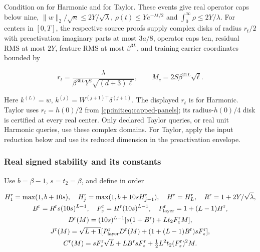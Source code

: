 Condition on  for Harmonic and
 for Taylor. These events give real operator caps below nine,
$\|w\|_2/\sqrt n\le2Y/\sqrt\lambda$,
$\rho(t)\le Ye^{-\lambda t/2}$ and $\int_0^\infty\rho\le2Y/\lambda$.
For centers in $[0,T]$, the respective source proofs supply complex
disks of radius $r_t/2$ with preactivation imaginary parts at most
$3a/8$, operator caps ten, residual RMS at most $2Y$, feature RMS at most
$\beta^{3L}$, and training carrier coordinates bounded by

\begin{equation}
\label{cp:init:eq:source-input}
r_t=\frac{\lambda}{\beta^{30L}Y^2\sqrt{(d+3)\ell}},\qquad
M_c=2S\beta^{21L}\sqrt\ell.
\end{equation}

Here $k^{(L)}=w$, $k^{(j)}=W^{(j+1)\top}\delta^{(j+1)}$.
The displayed $r_t$ is for Harmonic. Taylor uses $r_t=h(0)/2$
from \eqref{cp:init:eq:capped-panels}; its radius-$h(0)/4$ disk
is certified at every real center. Only declared Taylor queries, or real
unit Harmonic queries, use these complex domains. For Taylor, apply the
input reduction below and use its reduced dimension in the preactivation
envelope.

\subsubsection{Real signed stability and its constants}
\label{cp:init:sec:stability}

Use $b=\beta-1$, $s=t_2=\beta$, and define in order

\begin{equation}
\label{cp:init:eq:real-constants}
\begin{gathered}
H_1^{\rm r}=\max(1,b+10s),\quad
H_j^{\rm r}=\max(1,b+10sH_{j-1}^{\rm r}),\quad H^{\rm r}=H_L^{\rm r},\quad
R^{\rm r}=1+2Y/\sqrt\lambda,\\
B^{\rm r}=R^{\rm r}s(10s)^{L-1},\quad
F_z^{\rm r}=H^{\rm r}(10s)^{L-1},\quad
P_{\rm layer}^{\rm r}=1+(L-1)H^{\rm r},\\
D^{\rm r}(M)=(10s)^{L-1}
 [s(1+B^{\rm r})+Lt_2F_z^{\rm r}M],\\
J^{\rm r}(M)=\sqrt{L+1}
 [P_{\rm layer}^{\rm r}D^{\rm r}(M)+(1+(L-1)B^{\rm r})sF_z^{\rm r}],\\
C^{\rm r}(M)=sF_z^{\rm r}\sqrt L+LB^{\rm r}sF_z^{\rm r}
                  +\tfrac12L^2t_2(F_z^{\rm r})^2M.
\end{gathered}
\end{equation}

